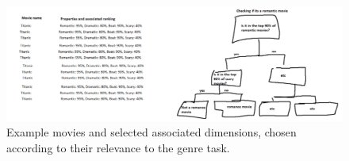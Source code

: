 \begin{figure}[t]
	\includegraphics[width=\textwidth]{images/tree and rep.png}
	\centering
	\caption{Example movies and selected associated dimensions, chosen according to their relevance to the genre task.}\label{ch3:TreeAndRep}
\end{figure}















